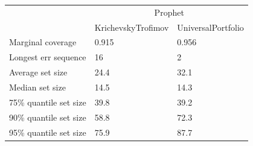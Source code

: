 \begin{tabular}{lll}
\toprule
& \multicolumn{2}{c}{Prophet} \\
& KrichevskyTrofimov & UniversalPortfolio \\
\midrule
Marginal coverage & 0.915 & 0.956 \\
Longest err sequence & 16 & 2 \\
Average set size & 24.4 & 32.1 \\
Median set size & 14.5 & 14.3 \\
75\% quantile set size & 39.8 & 39.2 \\
90\% quantile set size & 58.8 & 72.3 \\
95\% quantile set size & 75.9 & 87.7 \\
\bottomrule
\end{tabular}
